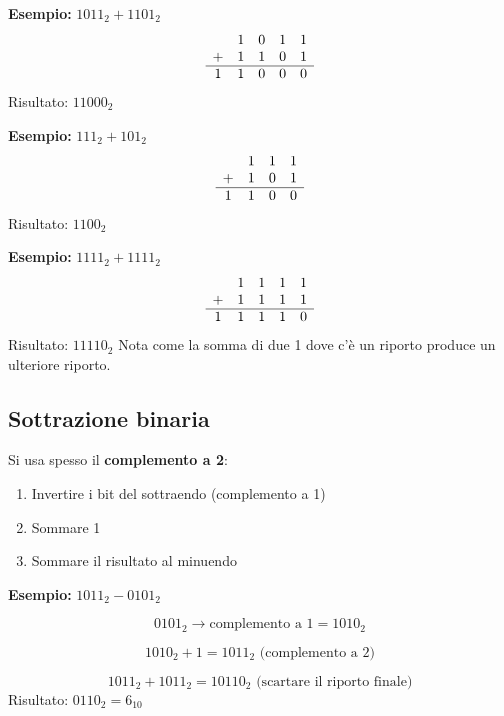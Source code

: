 \documentclass[12pt,a4paper]{article}
\begin{document}
\textbf{Esempio:} $1011_2 + 1101_2$
\[
\begin{array}{c c c c c}
 & 1 & 0 & 1 & 1 \\
+ & 1 & 1 & 0 & 1 \\
\hline
1 & 1 & 0 & 0 & 0
\end{array}
\]
Risultato: $11000_2$

\textbf{Esempio:} $111_2 + 101_2$
\[
\begin{array}{c c c c}
    & 1 & 1 & 1 \\
+   & 1 & 0 & 1 \\
\hline
1 & 1 & 0 & 0
\end{array}
\]
Risultato: $1100_2$

\textbf{Esempio:} $1111_2 + 1111_2$
\[
\begin{array}{c c c c c}
    & 1 & 1 & 1 & 1 \\
+   & 1 & 1 & 1 & 1 \\
\hline
1 & 1 & 1 & 1 & 0
\end{array}
\]
Risultato: $11110_2$
Nota come la somma di due 1 dove c'è un riporto produce un ulteriore riporto.

\subsection{Sottrazione binaria}

Si usa spesso il \textbf{complemento a 2}:
\begin{enumerate}
    \item Invertire i bit del sottraendo (complemento a 1)
    \item Sommare 1
    \item Sommare il risultato al minuendo
\end{enumerate}

\textbf{Esempio:} $1011_2 - 0101_2$

\[
0101_2 \rightarrow \text{complemento a 1} = 1010_2
\]

\[
1010_2 + 1 = 1011_2 \text{ (complemento a 2)}
\]

\[
1011_2 + 1011_2 = 10110_2 \text{ (scartare il riporto finale)}
\]
Risultato: $0110_2 = 6_{10}$
\end{document}
